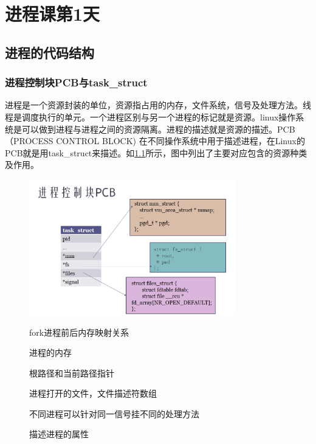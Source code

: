 

\partabstractrp{}
\partabstractlettrine{}{} %

\part{进程课第1天}

\chapter{进程的代码结构}
\section{进程控制块PCB与task\_struct}
进程是一个资源封装的单位，资源指占用的内存，文件系统，信号及处理方法。线程是调度执行的单元。一个进程区别与另一个进程的标记就是资源。linux操作系统是可以做到进程与进程之间的资源隔离。进程的描述就是资源的描述。PCB （PROCESS CONTROL BLOCK) 在不同操作系统中用于描述进程，在Linux的PCB就是用task\_struct来描述。如\ref{linux_pcb}所示，图中列出了主要对应包含的资源种类及作用。
\begin{figure}[H]
 \wdfigbox
  {\caption{fork进程前后内存映射关系}\label{linux_pcb}}
  {
  \includegraphics[width=9cm]{./figure/linux_pcb.png}
  }
\end{figure}
\begin{description}
  \item[] 进程的内存
  \item[] 根路径和当前路径指针
  \item[] 进程打开的文件，文件描述符数组
  \item[] 不同进程可以针对同一信号挂不同的处理方法
  \item[] 描述进程的属性
\end{description}

